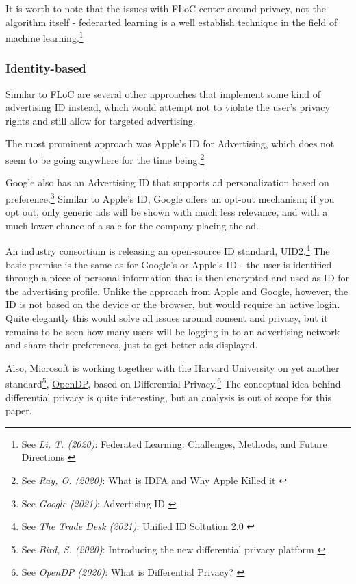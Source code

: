 It is worth to note that the issues with FLoC center around privacy, not the algorithm itself - federarted learning is a well establish technique in the field of machine learning.\footnote{See \textit{Li, T. (2020)}: Federated Learning: Challenges, Methods, and Future Directions \cite{9084352}}

\subsubsection{Identity-based}

Similar to FLoC are several other approaches that implement some kind of advertising ID instead, which would attempt not to violate the user's privacy rights and still allow for targeted advertising. 

The most prominent approach was Apple's ID for Advertising, which does not seem to be going anywhere for the time being.\footnote{See \textit{Ray, O. (2020)}: What is IDFA and Why Apple Killed it \cite{cleanRoom}}

Google also has an Advertising ID that supports ad personalization based on preference.\footnote{See \textit{Google (2021)}: Advertising ID \cite{advertisingId}} Similar to Apple's ID, Google offers an opt-out mechanism; if you opt out, only generic ads will be shown with much less relevance, and with a much lower chance of a sale for the company placing the ad.

An industry consortium is releasing an open-source ID standard, UID2.\footnote{See \textit{The Trade Desk (2021)}: Unified ID Soltution 2.0 \cite{tradeDesk}} The basic premise is the same as for Google's or Apple's ID - the user is identified through a piece of personal information that is then encrypted and used as ID for the advertising profile. Unlike the approach from Apple and Google, however, the ID is not based on the device or the browser, but would require an active login. Quite elegantly this would solve all issues around consent and privacy, but it remains to be seen how many users will be logging in to an advertising network and share their preferences, just to get better ads displayed.

Also, Microsoft is working together with the Harvard University on yet another standard\footnote{See \textit{Bird, S. (2020)}: Introducing the new differential privacy platform \cite{openDp}}, \href{https://opendp.org/}{OpenDP}, based on Differential Privacy.\footnote{See \textit{OpenDP (2020)}: What is Differential Privacy? \cite{diffPrivacy}} The conceptual idea behind differential privacy is quite interesting, but an analysis is out of scope for this paper.

